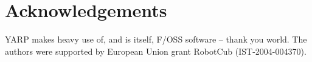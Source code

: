 
\section{Acknowledgements}

YARP makes heavy use of, and is itself, F/OSS software -- thank
you world.  The authors were supported by European Union
grant RobotCub (IST-2004-004370).




